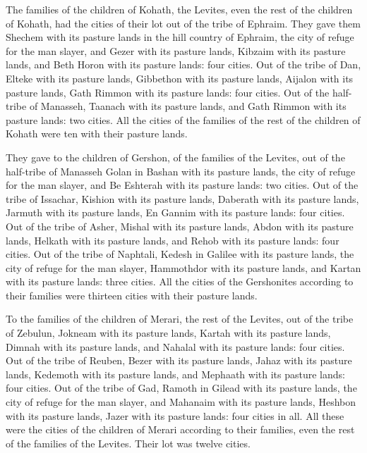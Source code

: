 \begin{paracol}{2}
\begin{otherlanguage}{english}
 The families of the children of Kohath, the Levites,
even the rest of the children of Kohath, had the cities of their lot out
of the tribe of Ephraim.  They gave them Shechem with its
pasture lands in the hill country of Ephraim, the city of refuge for the
man slayer, and Gezer with its pasture lands,  Kibzaim
with its pasture lands, and Beth Horon with its pasture lands: four
cities.  Out of the tribe of Dan, Elteke with its pasture
lands, Gibbethon with its pasture lands,  Aijalon with
its pasture lands, Gath Rimmon with its pasture lands: four cities.
 Out of the half-tribe of Manasseh, Taanach with its
pasture lands, and Gath Rimmon with its pasture lands: two cities.
 All the cities of the families of the rest of the
children of Kohath were ten with their pasture lands.

 They gave to the children of Gershon, of the families of
the Levites, out of the half-tribe of Manasseh Golan in Bashan with its
pasture lands, the city of refuge for the man slayer, and Be Eshterah
with its pasture lands: two cities.  Out of the tribe of
Issachar, Kishion with its pasture lands, Daberath with its pasture
lands,  Jarmuth with its pasture lands, En Gannim with
its pasture lands: four cities.  Out of the tribe of
Asher, Mishal with its pasture lands, Abdon with its pasture lands,
 Helkath with its pasture lands, and Rehob with its
pasture lands: four cities.  Out of the tribe of
Naphtali, Kedesh in Galilee with its pasture lands, the city of refuge
for the man slayer, Hammothdor with its pasture lands, and Kartan with
its pasture lands: three cities.  All the cities of the
Gershonites according to their families were thirteen cities with their
pasture lands.

 To the families of the children of Merari, the rest of
the Levites, out of the tribe of Zebulun, Jokneam with its pasture
lands, Kartah with its pasture lands,  Dimnah with its
pasture lands, and Nahalal with its pasture lands: four cities.
 Out of the tribe of Reuben, Bezer with its pasture
lands, Jahaz with its pasture lands,  Kedemoth with its
pasture lands, and Mephaath with its pasture lands: four cities.
 Out of the tribe of Gad, Ramoth in Gilead with its
pasture lands, the city of refuge for the man slayer, and Mahanaim with
its pasture lands,  Heshbon with its pasture lands, Jazer
with its pasture lands: four cities in all.  All these
were the cities of the children of Merari according to their families,
even the rest of the families of the Levites. Their lot was twelve
cities.


\end{otherlanguage}
\end{paracol}
